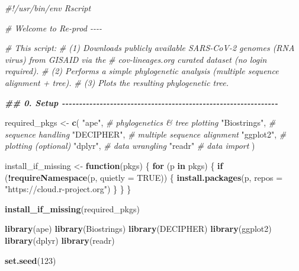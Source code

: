 \documentclass[
  11pt,
]{article}
\newenvironment{Shaded}{\begin{snugshade}}{\end{snugshade}}
\newcommand{\AttributeTok}[1]{\textcolor[rgb]{0.13,0.29,0.53}{#1}}
\newcommand{\CommentTok}[1]{\textcolor[rgb]{0.56,0.35,0.01}{\textit{#1}}}
\newcommand{\ConstantTok}[1]{\textcolor[rgb]{0.56,0.35,0.01}{#1}}
\newcommand{\ControlFlowTok}[1]{\textcolor[rgb]{0.13,0.29,0.53}{\textbf{#1}}}
\newcommand{\DecValTok}[1]{\textcolor[rgb]{0.00,0.00,0.81}{#1}}
\newcommand{\DocumentationTok}[1]{\textcolor[rgb]{0.56,0.35,0.01}{\textbf{\textit{#1}}}}
\newcommand{\FunctionTok}[1]{\textcolor[rgb]{0.13,0.29,0.53}{\textbf{#1}}}
\newcommand{\NormalTok}[1]{#1}
\newcommand{\OtherTok}[1]{\textcolor[rgb]{0.56,0.35,0.01}{#1}}
\newcommand{\SpecialCharTok}[1]{\textcolor[rgb]{0.81,0.36,0.00}{\textbf{#1}}}
\newcommand{\StringTok}[1]{\textcolor[rgb]{0.31,0.60,0.02}{#1}}
\begin{document}
\begin{Shaded}
\begin{Highlighting}[]
\CommentTok{\#!/usr/bin/env Rscript}

\CommentTok{\# Welcome to Re{-}prod {-}{-}{-}{-}}

\CommentTok{\# This script:}
\CommentTok{\# (1) Downloads publicly available SARS{-}CoV{-}2 genomes (RNA virus) from GISAID via the}
\CommentTok{\#     cov{-}lineages.org curated dataset (no login required).}
\CommentTok{\# (2) Performs a simple phylogenetic analysis (multiple sequence alignment + tree).}
\CommentTok{\# (3) Plots the resulting phylogenetic tree.}

\DocumentationTok{\#\# 0. Setup {-}{-}{-}{-}{-}{-}{-}{-}{-}{-}{-}{-}{-}{-}{-}{-}{-}{-}{-}{-}{-}{-}{-}{-}{-}{-}{-}{-}{-}{-}{-}{-}{-}{-}{-}{-}{-}{-}{-}{-}{-}{-}{-}{-}{-}{-}{-}{-}{-}{-}{-}{-}{-}{-}{-}{-}{-}{-}{-}{-}{-}{-}{-}}

\NormalTok{required\_pkgs }\OtherTok{\textless{}{-}} \FunctionTok{c}\NormalTok{(}
  \StringTok{"ape"}\NormalTok{,          }\CommentTok{\# phylogenetics \& tree plotting}
  \StringTok{"Biostrings"}\NormalTok{,   }\CommentTok{\# sequence handling}
  \StringTok{"DECIPHER"}\NormalTok{,     }\CommentTok{\# multiple sequence alignment}
  \StringTok{"ggplot2"}\NormalTok{,      }\CommentTok{\# plotting (optional)}
  \StringTok{"dplyr"}\NormalTok{,        }\CommentTok{\# data wrangling}
  \StringTok{"readr"}         \CommentTok{\# data import}
\NormalTok{)}

\NormalTok{install\_if\_missing }\OtherTok{\textless{}{-}} \ControlFlowTok{function}\NormalTok{(pkgs) \{}
  \ControlFlowTok{for}\NormalTok{ (p }\ControlFlowTok{in}\NormalTok{ pkgs) \{}
    \ControlFlowTok{if}\NormalTok{ (}\SpecialCharTok{!}\FunctionTok{requireNamespace}\NormalTok{(p, }\AttributeTok{quietly =} \ConstantTok{TRUE}\NormalTok{)) \{}
      \FunctionTok{install.packages}\NormalTok{(p, }\AttributeTok{repos =} \StringTok{"https://cloud.r{-}project.org"}\NormalTok{)}
\NormalTok{    \}}
\NormalTok{  \}}
\NormalTok{\}}

\FunctionTok{install\_if\_missing}\NormalTok{(required\_pkgs)}

\FunctionTok{library}\NormalTok{(ape)}
\FunctionTok{library}\NormalTok{(Biostrings)}
\FunctionTok{library}\NormalTok{(DECIPHER)}
\FunctionTok{library}\NormalTok{(ggplot2)}
\FunctionTok{library}\NormalTok{(dplyr)}
\FunctionTok{library}\NormalTok{(readr)}

\FunctionTok{set.seed}\NormalTok{(}\DecValTok{123}\NormalTok{)}
\end{Highlighting}
\end{Shaded}
\end{document}
